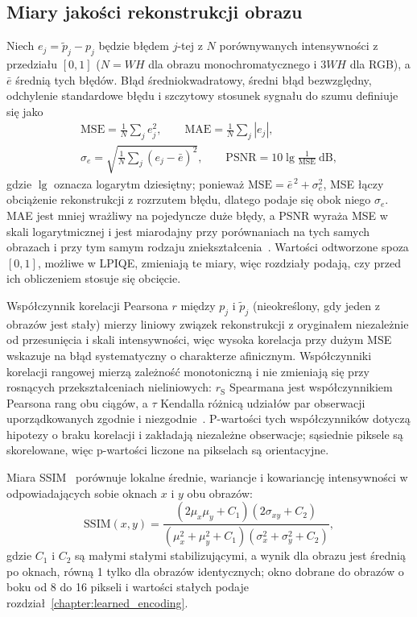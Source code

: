 \subsection{Miary jakości rekonstrukcji obrazu}\label{subsec:tb:qimg:metrics}

Niech $e_j=\tilde{p}_j-p_j$ będzie błędem $j$-tej z $N$ porównywanych intensywności z przedziału $[0,1]$ ($N=WH$ dla obrazu monochromatycznego i $3WH$ dla RGB), a $\bar{e}$ średnią tych błędów.
Błąd średniokwadratowy, średni błąd bezwzględny, odchylenie standardowe błędu i szczytowy stosunek sygnału do szumu definiuje się jako
\begin{equation}\label{eq:tb:qimg:errors}
\begin{gathered}
\mathrm{MSE}=\frac{1}{N}\sum_{j}e_j^2,
\qquad
\mathrm{MAE}=\frac{1}{N}\sum_{j}|e_j|,
\\
\sigma_e=\sqrt{\frac{1}{N}\sum_{j}(e_j-\bar{e})^2},
\qquad
\mathrm{PSNR}=10\lg\frac{1}{\mathrm{MSE}}\ \mathrm{dB},
\end{gathered}
\end{equation}
gdzie $\lg$ oznacza logarytm dziesiętny; ponieważ $\mathrm{MSE}=\bar{e}^{\,2}+\sigma_e^2$, MSE łączy obciążenie rekonstrukcji z rozrzutem błędu, dlatego podaje się obok niego $\sigma_e$.
MAE jest mniej wrażliwy na pojedyncze duże błędy, a PSNR wyraża MSE w skali logarytmicznej i jest miarodajny przy porównaniach na tych samych obrazach i przy tym samym rodzaju zniekształcenia~\cite{huynh-thu_scope_2008}.
Wartości odtworzone spoza $[0,1]$, możliwe w LPIQE, zmieniają te miary, więc rozdziały podają, czy przed ich obliczeniem stosuje się obcięcie.

Współczynnik korelacji Pearsona $r$ między $p_j$ i $\tilde{p}_j$ (nieokreślony, gdy jeden z obrazów jest stały) mierzy liniowy związek rekonstrukcji z oryginałem niezależnie od przesunięcia i skali intensywności, więc wysoka korelacja przy dużym MSE wskazuje na błąd systematyczny o charakterze afinicznym.
Współczynniki korelacji rangowej mierzą zależność monotoniczną i nie zmieniają się przy rosnących przekształceniach nieliniowych: $r_{\mathrm{S}}$ Spearmana jest współczynnikiem Pearsona rang obu ciągów, a $\tau$ Kendalla różnicą udziałów par obserwacji uporządkowanych zgodnie i niezgodnie~\cite{bib:statistics_wilc}.
P-wartości tych współczynników dotyczą hipotezy o braku korelacji i zakładają niezależne obserwacje; sąsiednie piksele są skorelowane, więc p-wartości liczone na pikselach są orientacyjne.

Miara SSIM~\cite{wang_image_2004} porównuje lokalne średnie, wariancje i kowariancję intensywności w odpowiadających sobie oknach $x$ i $y$ obu obrazów:
\begin{equation}\label{eq:tb:qimg:ssim}
\mathrm{SSIM}(x,y)=\frac{(2\mu_x\mu_y+C_1)(2\sigma_{xy}+C_2)}{(\mu_x^2+\mu_y^2+C_1)(\sigma_x^2+\sigma_y^2+C_2)},
\end{equation}
gdzie $C_1$ i $C_2$ są małymi stałymi stabilizującymi, a wynik dla obrazu jest średnią po oknach, równą 1 tylko dla obrazów identycznych; okno dobrane do obrazów o boku od 8 do 16 pikseli i wartości stałych podaje rozdział~\ref{chapter:learned_encoding}.
